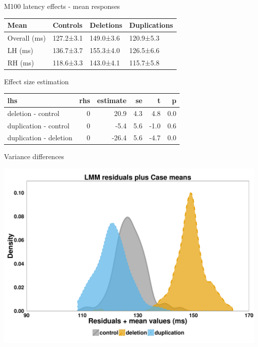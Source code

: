 \begin{frame}{M100 latency effects - mean responses}

\begin{longtable}[c]{@{}llll@{}}
\toprule
Mean & Controls & Deletions & Duplications\tabularnewline
\midrule
\endhead
Overall (ms) & 127.2±3.1 & 149.0±3.6 & 120.9±5.3\tabularnewline
LH (ms) & 136.7±3.7 & 155.3±4.0 & 126.5±6.6\tabularnewline
RH (ms) & 118.6±3.3 & 143.0±4.1 & 115.7±5.8\tabularnewline
\bottomrule
\end{longtable}

\end{frame}

\begin{frame}{Effect size estimation}

\begin{longtable}[c]{@{}lrrrrr@{}}
\toprule
lhs & rhs & estimate & se & t & p\tabularnewline
\midrule
\endhead
deletion - control & 0 & 20.9 & 4.3 & 4.8 & 0.0\tabularnewline
duplication - control & 0 & -5.4 & 5.6 & -1.0 & 0.6\tabularnewline
duplication - deletion & 0 & -26.4 & 5.6 & -4.7 & 0.0\tabularnewline
\bottomrule
\end{longtable}

\end{frame}

\begin{frame}{Variance differences}

\includegraphics{m100-beamer-presentation-version_files/figure-beamer/residuals plus means-1.pdf}

\end{frame}

